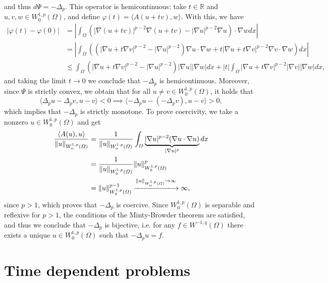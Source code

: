 \documentclass{article}
\newcommand{\R}{\mathbb{R}}
\begin{document}
and thus $d\Psi = -\Delta_p$. This operator is hemicontinuous: take $t\in \R$ and $u,v,w\in W_0^{1,p}(\Omega)$, and define $\varphi(t) = \langle A(u+tv),w\rangle$. With this, we have
\begin{align*}
    |\varphi(t)-\varphi(0)| &= \left|\int_\Omega \left(|\nabla (u+tv)|^{p-2}\nabla (u+tv) - |\nabla u|^{p-2}\nabla u\right)\cdot \nabla w dx \right|\\
    &= \left|\int_\Omega \left((|\nabla u + t\nabla v|^{p-2} - |\nabla u|^{p-2})\nabla u \cdot \nabla w + t|\nabla u + t\nabla v|^{p-2} \nabla v\cdot \nabla w \right) dx\right|\\
    &\leq \int_\Omega \left(|\nabla u + t\nabla v|^{p-2} - |\nabla u|^{p-2}\right)|\nabla u||\nabla w| dx + |t|\int_\Omega |\nabla u + t\nabla v|^{p-2}|\nabla v||\nabla w| dx,
\end{align*}
and taking the limit $t\to 0$ we conclude that $-\Delta_p$ is hemicontinuous. Moreover, since $\Psi$ is strictly convex, we obtain that for all $u\neq v \in W_0^{1,p}(\Omega)$, it holds that
\begin{equation*}
    \langle \Delta_p u - \Delta_p v, u-v\rangle < 0 \implies \langle -\Delta_p u - (-\Delta_p v), u-v\rangle > 0,
\end{equation*}
which implies that $-\Delta_p$ is strictly monotone. To prove coercivity, we take a nonzero $u\in W_0^{1,p}(\Omega)$ and get
\begin{align*}
    \frac{\langle A(u),u\rangle}{\|u\|_{W_0^{1,p}(\Omega)}} &= \frac{1}{\|u\|_{W_0^{1,p}(\Omega)}}\int_\Omega \underbrace{|\nabla u|^{p-2}(\nabla u\cdot\nabla u)}_{|\nabla u|^p} dx\\
    &= \frac{1}{\|u\|_{W_0^{1,p}(\Omega)}}\|u\|_{W_0^{1,p}(\Omega)}^p\\
    &= \|u\|_{W_0^{1,p}(\Omega)}^{p-1}\xlongrightarrow{\|u\|_{W_0^{1,p}(\Omega)}\to\infty}\infty,
\end{align*}
since $p>1$, which proves that $-\Delta_p$ is coercive. Since $W_0^{1,p}(\Omega)$ is separable and reflexive for $p>1$, the conditions of the Minty-Browder theorem are satisfied, and thus we conclude that $-\Delta_p$ is bijective, i.e. for any $f\in W^{-1,q}(\Omega)$ there exists a unique $u\in W_0^{1,p}(\Omega)$ such that $-\Delta_p u = f$.
\section{Time dependent problems}
\end{document}
